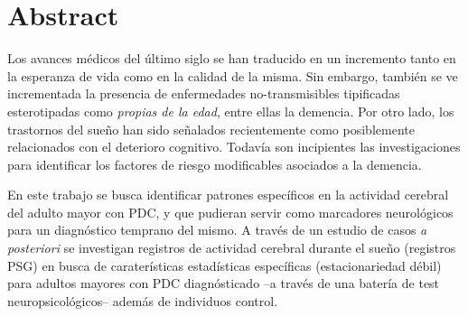 % 
% 
%


\chapter*{Abstract}

Los avances m\'edicos del \'ultimo siglo se han traducido en un incremento tanto en la esperanza
de vida como en la calidad de la misma. Sin embargo, tambi\'en se ve incrementada la presencia
de enfermedades no-transmisibles tipificadas esterotipadas como \textit{propias de la edad},
entre ellas la demencia.
Por otro lado, los trastornos del sue\~no 
han sido se\~nalados recientemente como posiblemente 
relacionados con el deterioro cognitivo.
Todav\'ia son incipientes las investigaciones para identificar los factores de riesgo modificables
asociados a la demencia. \cite{PlanAlzheimer04}


En este trabajo se busca identificar patrones espec\'ificos en la actividad cerebral del adulto
mayor con PDC, y que pudieran servir como marcadores neurol\'ogicos para un diagn\'ostico
temprano del mismo.
A trav\'es de un estudio de casos \textit{a posteriori}
se investigan registros de actividad cerebral durante el sue\~no (registros PSG)
en busca de carater\'isticas estad\'isticas espec\'ificas (estacionariedad d\'ebil) para adultos 
mayores con PDC diagn\'osticado --a trav\'es de una bater\'ia de test neuropsicol\'ogicos--
adem\'as de individuos control.

